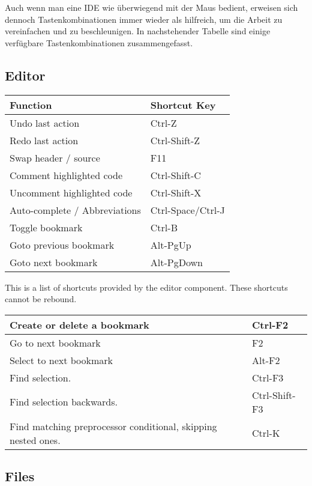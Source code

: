 Auch wenn man eine IDE wie \codeblocks überwiegend mit der Maus bedient, erweisen sich dennoch Tastenkombinationen immer wieder als hilfreich, um die Arbeit zu vereinfachen und zu beschleunigen. In nachstehender Tabelle sind einige verfügbare Tastenkombinationen zusammengefasst.

\subsection{Editor}

\begin{tabular}{|l|l|}\hline
Function		&	Shortcut Key\\ \hline
Undo last action 	&	Ctrl-Z\\ \hline
Redo last action 	&	Ctrl-Shift-Z\\ \hline
Swap header / source 	&	F11\\ \hline
Comment highlighted code &	Ctrl-Shift-C\\ \hline
Uncomment highlighted code & 	Ctrl-Shift-X\\ \hline
Auto-complete / Abbreviations & 	Ctrl-Space/Ctrl-J\\ \hline
Toggle bookmark 	&	Ctrl-B\\ \hline
Goto previous bookmark 	&	Alt-PgUp\\ \hline
Goto next bookmark 	&	Alt-PgDown\\ \hline
\end{tabular}

This is a list of shortcuts provided by the \codeblocks editor component. These shortcuts cannot be rebound.

\begin{tabular}{|l|l|}\hline
Create or delete a bookmark	&	Ctrl-F2\\ \hline
Go to next bookmark		&	F2\\ \hline
Select to next bookmark		&	Alt-F2\\ \hline
Find selection.			& 	Ctrl-F3\\ \hline
Find selection backwards. 	&	Ctrl-Shift-F3\\ \hline
Find matching preprocessor conditional, skipping nested ones. &	Ctrl-K\\ \hline
\end{tabular}

\subsection{Files}

